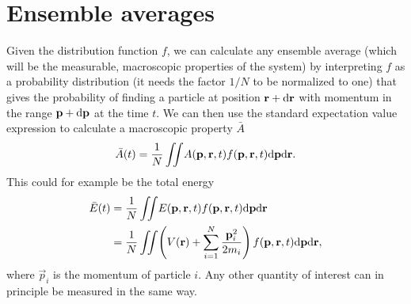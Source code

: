 \section{Ensemble averages}
\label{sec:kinetic_theory_ensemble_averages}
Given the distribution function $f$, we can calculate any ensemble average (which will be the measurable, macroscopic properties of the system) by interpreting $f$ as a probability distribution (it needs the factor $1/N$ to be normalized to one) that gives the probability of finding a particle at position $\mathbf r + \mathrm{d}\mathbf r$ with momentum in the range $\mathbf p + \mathrm{d}\mathbf p$ at the time $t$. We can then use the standard expectation value expression to calculate a macroscopic property $\bar A$
\begin{align}
	\label{eq:ensemble_average}
	\bar A(t) = \frac{1}{ N}\iint\! A(\mathbf p, \mathbf r, t)f(\mathbf p, \mathbf r, t)\mathrm{d}\mathbf p\mathrm{d}\mathbf r.
\end{align}
This could for example be the total energy
\begin{align}
	\bar E(t) &= \frac{1}{ N}\iint\! E(\mathbf p, \mathbf r, t)f(\mathbf p, \mathbf r, t)\mathrm{d}\mathbf p\mathrm{d}\mathbf r \\
	&= \frac{1}{ N}\iint\! \left(V(\mathbf r) + \sum_{i=1}^N \frac{\mathbf p_i^2}{2m_i} \right)f(\mathbf p, \mathbf r, t)\mathrm{d}\mathbf p \mathrm{d}\mathbf r,
\end{align}
where $\vec p_i$ is the momentum of particle $i$. Any other quantity of interest can in principle be measured in the same way. 

